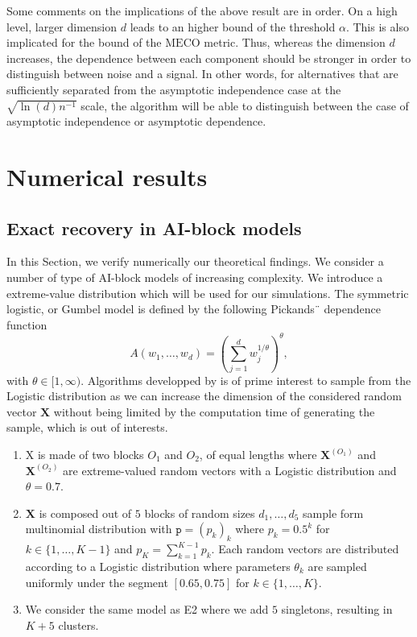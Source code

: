 \documentclass[11pt]{article}
\newcommand{\MECO}{\mathrm{MECO}}
\theoremstyle{definition}
\begin{document}
	Some comments on the implications of the above result are in order. On a high level, larger dimension $d$ leads to an higher bound of the threshold $\alpha$. This is also implicated for the bound of the $\MECO$ metric. Thus, whereas the dimension $d$ increases, the dependence between each component should be stronger in order to distinguish between noise and a signal. In other words, for alternatives that are sufficiently separated from the asymptotic independence case at the $\sqrt{\ln(d)n^{-1}}$ scale, the algorithm will be able to distinguish between the case of asymptotic independence or asymptotic dependence.
	
	\section{Numerical results}
		\label{sec:num}
	
		\subsection{Exact recovery in AI-block models}
		\label{subsec:exact_recov}
	
	In this Section, we verify numerically our theoretical findings. We consider a number of type of AI-block models of increasing complexity. We introduce a extreme-value distribution which will be used for our simulations. The symmetric logistic, or Gumbel model \cite{gumbel1960} is defined by the   following Pickands¨ dependence function
            \begin{equation*}
                A(w_1,\dots,w_d) = \left( \sum_{j=1}^d w_j^{1/\theta}\right)^{\theta},
            \end{equation*}
            with $\theta \in [1, \infty)$. Algorithms developped by \cite{stephenson2003simulating} is of prime interest to sample from the Logistic distribution as we can increase the dimension of the considered random vector $\textbf{X}$ without being limited by the computation time of generating the sample, which is out of interests.
            
    \begin{enumerate}[label = E\arabic*, leftmargin=*]
    		\item X is made of two blocks $O_1$ and $O_2$, of equal lengths where $\textbf{X}^{(O_1)}$ and $\textbf{X}^{(O_2)}$ are extreme-valued random vectors with a Logistic distribution and $\theta = 0.7$. \label{exp:E1}
    		\item $\textbf{X}$ is composed out of $5$ blocks of random sizes $d_1,\dots,d_5$ sample form multinomial distribution with $\texttt{p} = (p_k)_{k}$ where $p_k = 0.5^k$ for $k \in \{1,\dots,K-1\}$ and $p_K = \sum_{k=1}^{K-1} p_k$. Each random vectors are distributed according to a Logistic distribution where parameters $\theta_k$ are sampled uniformly under the segment $[0.65, 0.75]$ for $k \in \{1,\dots,K\}$. \label{exp:E2}
    		\item We consider the same model as E2 where we add $5$ singletons, resulting in $K+5$ clusters. \label{exp:E3}
    \end{enumerate}
    
\end{document}
